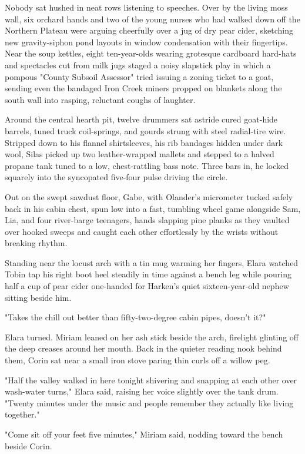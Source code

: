 Nobody sat hushed in neat rows listening to speeches. Over by the living moss wall, six orchard hands and two of the young nurses who had walked down off the Northern Plateau were arguing cheerfully over a jug of dry pear cider, sketching new gravity-siphon pond layouts in window condensation with their fingertips. Near the soup kettles, eight ten-year-olds wearing grotesque cardboard hard-hats and spectacles cut from milk jugs staged a noisy slapstick play in which a pompous "County Subsoil Assessor" tried issuing a zoning ticket to a goat, sending even the bandaged Iron Creek miners propped on blankets along the south wall into rasping, reluctant coughs of laughter.

Around the central hearth pit, twelve drummers sat astride cured goat-hide barrels, tuned truck coil-springs, and gourds strung with steel radial-tire wire. Stripped down to his flannel shirtsleeves, his rib bandages hidden under dark wool, Silas picked up two leather-wrapped mallets and stepped to a halved propane tank tuned to a low, chest-rattling bass note. Three bars in, he locked squarely into the syncopated five-four pulse driving the circle.

Out on the swept sawdust floor, Gabe, with Olander's micrometer tucked safely back in his cabin chest, spun low into a fast, tumbling wheel game alongside Sam, Lia, and four river-barge teenagers, hands slapping pine planks as they vaulted over hooked sweeps and caught each other effortlessly by the wrists without breaking rhythm.

Standing near the locust arch with a tin mug warming her fingers, Elara watched Tobin tap his right boot heel steadily in time against a bench leg while pouring half a cup of pear cider one-handed for Harken's quiet sixteen-year-old nephew sitting beside him.

"Takes the chill out better than fifty-two-degree cabin pipes, doesn't it?"

Elara turned. Miriam leaned on her ash stick beside the arch, firelight glinting off the deep creases around her mouth. Back in the quieter reading nook behind them, Corin sat near a small iron stove paring thin curls off a willow peg.

"Half the valley walked in here tonight shivering and snapping at each other over wash-water turns," Elara said, raising her voice slightly over the tank drum. "Twenty minutes under the music and people remember they actually like living together."

"Come sit off your feet five minutes," Miriam said, nodding toward the bench beside Corin.

